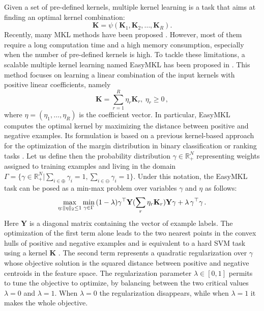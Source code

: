Given a set of pre-defined kernels, multiple kernel learning is a task that aims at finding an optimal kernel combination: 
\begin{equation}
\textbf{K} = \psi(\textbf{K}_1, \textbf{K}_2,\ldots, \textbf{K}_R) .
\end{equation}
Recently, many MKL methods have been proposed \cite{gonen,wang}. However, most of them require a long computation time and a high memory consumption, especially when the number of pre-defined kernels is high. To tackle these limitations, a scalable multiple kernel learning named EasyMKL has been proposed in \cite{easymkl}. This method focuses on learning a linear combination of the input kernels with positive linear coefficients, namely
\begin{equation}
\textbf{K} =  \sum_{r=1}^{R} {\eta_r \textbf{K}_r}, \ \eta_r \geq 0 \, ,
\end{equation}
where $\eta=(\eta_{1}, \dots , \eta_{R})$ is the coefficient vector. In particular, EasyMKL computes the optimal kernel by maximizing the distance between positive and negative examples. Its formulation is based on a previous kernel-based approach for the optimization of the margin distribution in binary classification or ranking tasks \cite{komd}. Let us define then the probability distribution $\gamma \in \mathbb{R}^{N}_{+}$ representing weights assigned to training examples and living in the domain $\Gamma = \{ \gamma \in \mathbb{R}^{N}_{+} | \sum_{i \in \oplus} \gamma_{i}=1, \sum_{i \in \ominus} \gamma_{i}=1\}$. Under this notation, the EasyMKL task can be posed as a min-max problem over variables $\gamma$ and $\eta$ as follows:
\begin{equation}
\max\limits_{\eta:\| \eta \|_2 \leq 1}\min\limits_{\gamma \in \Gamma}\, (1 - \lambda) \gamma^{\top}\\ \textbf{Y} (\sum_{r}{\eta_{r} \textbf{K}_{r}})\textbf{Y} \gamma + \lambda \, \gamma^{\top} \gamma \, .
\end{equation}
Here $\textbf{Y}$ is a diagonal matrix containing the vector of example labels. The optimization of the first term alone leads to the two nearest points in the convex hulls of positive and negative examples and is equivalent to a hard SVM task using a kernel $\textbf{K}$ \cite{komd}. The second term represents a quadratic regularization over $\gamma$ whose objective solution is the squared distance between positive and negative centroids in the feature space. The regularization parameter $\lambda \in [0,1]$ permits to tune the objective to optimize, by balancing between the two critical values $\lambda=0$ and $\lambda=1$. When $\lambda=0$ the regularization disappears, while when $\lambda=1$ it makes the whole objective.

